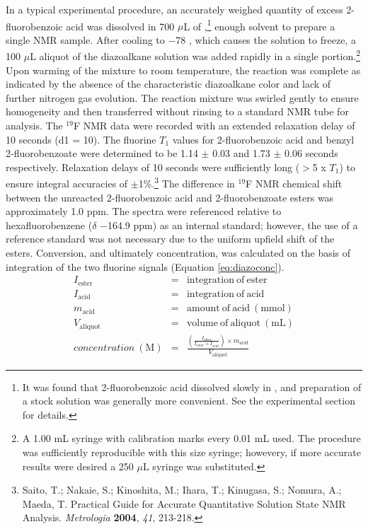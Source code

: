 In a typical experimental procedure, an accurately weighed quantity of excess
2-fluoro\-benzoic acid was dissolved in 700 $\mu$L of ,\footnote{It was found that
2-fluorobenzoic acid dissolved slowly in , and preparation of a stock solution was
generally more convenient. See the experimental section for details.} enough solvent to prepare a
single NMR sample.
After cooling to $-$78 \degc, which causes the solution to freeze, a 100 $\mu$L aliquot of the
diazoalkane solution was added rapidly in a single portion.\footnote{A 1.00 mL syringe with calibration marks every 0.01 mL used.
The procedure was sufficiently reproducible with this size syringe; howevery, if more accurate
results were desired a 250 $\mu$L syringe was substituted.} Upon warming of the mixture to room
temperature, the reaction was complete as indicated by the absence of the characteristic diazoalkane
color and lack of further nitrogen gas evolution. The reaction mixture was swirled gently to ensure
homogeneity and then transferred without rinsing to a standard NMR tube for analysis. The $^{19}$F
NMR data were recorded with an extended relaxation delay of 10 seconds (d1 = 10). The fluorine $T_1$
values for 2-fluorobenzoic acid and benzyl 2-fluorobenzoate were determined to be 1.14 $\pm$ 0.03
and 1.73 $\pm$ 0.06 seconds respectively. Relaxation delays of 10 seconds were sufficiently long
($>$5 x $T_1$) to ensure integral accuracies of $\pm$1\%.\footnote{{\frenchspacing Saito, T.;
Nakaie, S.; Kinoshita, M.; Ihara, T.; Kinugasa, S.; Nomura, A.; Maeda, T. Practical Guide for Accurate
Quantitative Solution State NMR Analysis. \textit{Metrologia} \textbf{2004}, \textit{41}, 213-218.}} The difference in $^{19}$F NMR chemical shift between the unreacted 2-fluorobenzoic acid and 2-fluorobenzoate esters was approximately 1.0 ppm. The spectra were referenced relative to hexafluorobenzene ($\delta$ $-$164.9 ppm) as an internal standard; however, the use
of a reference standard was not necessary due to the uniform upfield shift of the esters.
Conversion, and ultimately concentration, was calculated on the basis of integration of the two
fluorine signals (Equation \ref{eq:diazoconc}).
\begin{eqnarray}
I_{\mathrm{ester}} &=& \mathrm{integration\  of\  ester} \\
I_{\mathrm{acid}} &=& \mathrm{integration\  of\  acid} \\
m_{\mathrm{acid}} &=& \mathrm{amount\ of\  acid\ (mmol)} \\
V_{\mathrm{aliquot}} &=& \mathrm{volume\ of\ aliquot\ (mL)} \\
concentration\  \mathrm{(M)} &=& \frac{\left(\frac{I_{\mathrm{ester}}}{I_{\mathrm{ester}} +
I_{\mathrm{acid}}} \right) \times m_{\mathrm{acid}}}{V_{\mathrm{aliquot}}} \label{eq:diazoconc}
\end{eqnarray}
\vspace{-25pt}

